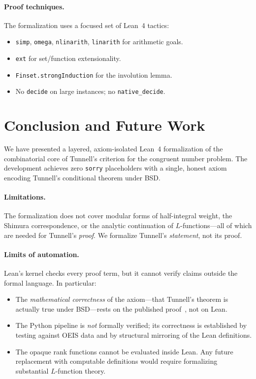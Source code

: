 \documentclass[11pt,a4paper]{article}
\theoremstyle{definition}
\newcommand{\lean}[1]{\texttt{#1}}
\begin{document}
\paragraph{Proof techniques.}
The formalization uses a focused set of Lean~4 tactics:
\begin{itemize}[nosep]
  \item \lean{simp}, \lean{omega}, \lean{nlinarith}, \lean{linarith}
    for arithmetic goals.
  \item \lean{ext} for set/function extensionality.
  \item \lean{Finset.strongInduction} for the involution lemma.
  \item No \lean{decide} on large instances; no \lean{native\_decide}.
\end{itemize}

\section{Conclusion and Future Work}\label{sec:conclusion}

We have presented a layered, axiom-isolated Lean~4 formalization of
the combinatorial core of Tunnell's criterion for the congruent
number problem.  The development achieves zero \lean{sorry}
placeholders with a single, honest axiom encoding Tunnell's
conditional theorem under BSD\@.

\paragraph{Limitations.}
The formalization does not cover modular forms of half-integral
weight, the Shimura correspondence, or the analytic continuation
of $L$-functions---all of which are needed for Tunnell's
\emph{proof}.  We formalize Tunnell's \emph{statement}, not its
proof.

\paragraph{Limits of automation.}
Lean's kernel checks every proof term, but it cannot verify
claims outside the formal language.  In particular:
\begin{itemize}[nosep]
  \item The \emph{mathematical correctness} of the axiom---that
    Tunnell's theorem is actually true under BSD---rests on
    the published proof~\cite{Tunnell1983}, not on Lean.
  \item The Python pipeline is \emph{not} formally verified;
    its correctness is established by testing against OEIS data
    and by structural mirroring of the Lean definitions.
  \item The opaque rank functions cannot be evaluated inside Lean.
    Any future replacement with computable definitions would
    require formalizing substantial $L$-function theory.
\end{itemize}
\end{document}
